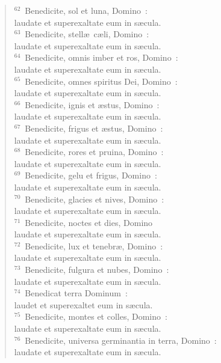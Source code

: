 \begin{verse}
${}^{62}$~Benedicite, sol et luna, Domino~:\\ laudate et superexaltate eum in s\ae cula.\\
${}^{63}$~Benedicite, stell\ae\ c\ae li, Domino~:\\ laudate et superexaltate eum in s\ae cula.\\
${}^{64}$~Benedicite, omnis imber et ros, Domino~:\\ laudate et superexaltate eum in s\ae cula.\\
${}^{65}$~Benedicite, omnes spiritus Dei, Domino~:\\ laudate et superexaltate eum in s\ae cula.\\
${}^{66}$~Benedicite, ignis et \ae stus, Domino~:\\ laudate et superexaltate eum in s\ae cula.\\
${}^{67}$~Benedicite, frigus et \ae stus, Domino~:\\ laudate et superexaltate eum in s\ae cula.\\
${}^{68}$~Benedicite, rores et pruina, Domino~:\\ laudate et superexaltate eum in s\ae cula.\\
${}^{69}$~Benedicite, gelu et frigus, Domino~:\\ laudate et superexaltate eum in s\ae cula.\\
${}^{70}$~Benedicite, glacies et nives, Domino~:\\ laudate et superexaltate eum in s\ae cula.\\
${}^{71}$~Benedicite, noctes et dies, Domino\\ laudate et superexaltate eum in s\ae cula.\\
${}^{72}$~Benedicite, lux et tenebr\ae , Domino~:\\ laudate et superexaltate eum in s\ae cula.\\
${}^{73}$~Benedicite, fulgura et nubes, Domino~:\\ laudate et superexaltate eum in s\ae cula.\\
${}^{74}$~Benedicat terra Dominum~:\\ laudet et superexaltet eum in s\ae cula.\\
${}^{75}$~Benedicite, montes et colles, Domino~:\\ laudate et superexaltate eum in s\ae cula.\\
${}^{76}$~Benedicite, universa germinantia in terra, Domino~:\\ laudate et superexaltate eum in s\ae cula.\\

\end{verse}
